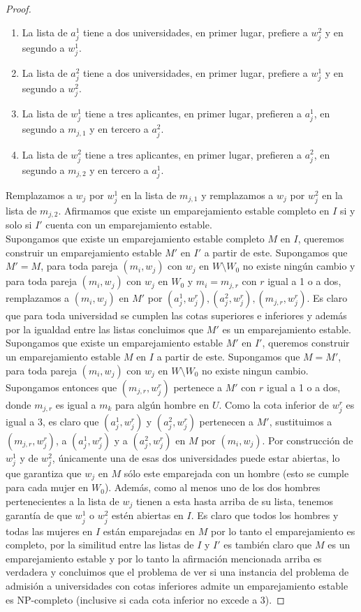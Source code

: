 \begin{proof}
\begin{enumerate}
\item La lista de $a_j^1$ tiene a dos universidades, en primer lugar, prefiere a $w_j^2$ y en segundo a $w_j^1$.
\item La lista de $a_j^2$ tiene a dos universidades, en primer lugar, prefiere a $w_j^1$ y en segundo a $w_j^2$.
\item La lista de $w_j^1$ tiene a tres aplicantes, en primer lugar, prefieren a $a_j^1$, en segundo a $m_{j,1}$ y en tercero a $a_j^2$.
\item La lista de $w_j^2$ tiene a tres aplicantes, en primer lugar, prefieren a $a_j^2$, en segundo a $m_{j,2}$ y en tercero a $a_j^1$.
\end{enumerate}
Remplazamos a $w_j$ por $w_j^1$ en la lista de $m_{j,1}$ y remplazamos a $w_j$ por $w_j^2$ en la lista de $m_{j,2}$. Afirmamos que existe un emparejamiento estable completo en $I$ si y solo si $I'$ cuenta con un emparejamiento estable. \\
Supongamos que existe un emparejamiento estable completo $M$ en $I$, queremos construir un emparejamiento estable $M'$ en $I'$ a partir de este. Supongamos que $M'=M$, para toda pareja $(m_i,w_j)$ con $w_j$ en $W\setminus W_0$ no existe ningún cambio y para toda pareja $(m_i,w_j)$ con $w_j$ en $W_0$ y $m_i=m_{j,r}$ con $r$ igual a 1 o a dos, remplazamos a $(m_i,w_j)$ en $M'$ por $(a_j^1,w_j^r), (a_j^2,w_j^r),(m_{j,r}, w_j^r)$. Es claro que para toda universidad se cumplen las cotas superiores e inferiores y además por la igualdad entre las listas concluimos que $M'$ es un emparejamiento estable. \\
Supongamos que existe un emparejamiento estable $M'$ en $I'$, queremos construir un emparejamiento estable $M$ en $I$ a partir de este. Supongamos que $M=M'$, para toda pareja $(m_i,w_j)$ con $w_j$ en $W\setminus W_0$ no existe ningun cambio. Supongamos entonces que $(m_{j,r}, w_{j}^{r})$ pertenece a $M'$ con $r$ igual a 1 o a dos, donde $m_{j,r}$ es igual a $m_k$ para algún hombre en $U$. Como la cota inferior de $w_{j}^{r}$ es igual a 3, es claro que $(a_j^1,w_{j}^{r})$ y $(a_j^2,w_{j}^{r})$ pertenecen a $M'$, sustituimos a $(m_{j,r}, w_{j}^{r})$, a $(a_j^1,w_{j}^{r})$ y a $(a_j^2,w_{j}^{r})$ en $M$ por $(m_i,w_j)$. Por construcción de $w_j^1$ y de $w_j^2$, únicamente una de esas dos universidades puede estar abiertas, lo que garantiza que $w_j$ en $M$ sólo este emparejada con un hombre (esto se cumple para cada mujer en $W_0$). Además, como al menos uno de los dos hombres pertenecientes a la lista de $w_j$ tienen a esta hasta arriba de su lista, tenemos garantía de que $w_j^1$ o $w_j^2$ estén abiertas en $I$. Es claro que todos los hombres y todas las mujeres en $I$ están emparejadas en $M$ por lo tanto el emparejamiento es completo, por la similitud entre las listas de $I$ y $I'$ es también claro que $M$ es un emparejamiento estable y por lo tanto la afirmación mencionada arriba es verdadera y concluimos que el problema de ver si una instancia del problema de admisión a universidades con cotas inferiores admite un emparejamiento estable es NP-completo (inclusive si cada cota inferior no excede a 3).
\end{proof}

